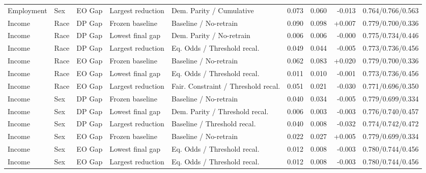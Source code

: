 \begin{table}[!t]
\begin{tabular}{lll l p{} rrr l}
Employment & Sex & EO Gap & Largest reduction & Dem. Parity / Cumulative & 0.073 & 0.060 & -0.013 & 0.764/0.766/0.563 \\
Income & Race & DP Gap & Frozen baseline & Baseline / No-retrain & 0.090 & 0.098 & +0.007 & 0.779/0.700/0.336 \\
Income & Race & DP Gap & Lowest final gap & Dem. Parity / No-retrain & 0.006 & 0.006 & -0.000 & 0.775/0.734/0.446 \\
Income & Race & DP Gap & Largest reduction & Eq. Odds / Threshold recal. & 0.049 & 0.044 & -0.005 & 0.773/0.736/0.456 \\
Income & Race & EO Gap & Frozen baseline & Baseline / No-retrain & 0.062 & 0.083 & +0.020 & 0.779/0.700/0.336 \\
Income & Race & EO Gap & Lowest final gap & Eq. Odds / Threshold recal. & 0.011 & 0.010 & -0.001 & 0.773/0.736/0.456 \\
Income & Race & EO Gap & Largest reduction & Fair. Constraint / Threshold recal. & 0.051 & 0.021 & -0.030 & 0.771/0.696/0.350 \\
Income & Sex & DP Gap & Frozen baseline & Baseline / No-retrain & 0.040 & 0.034 & -0.005 & 0.779/0.699/0.334 \\
Income & Sex & DP Gap & Lowest final gap & Dem. Parity / Threshold recal. & 0.006 & 0.003 & -0.003 & 0.776/0.740/0.457 \\
Income & Sex & DP Gap & Largest reduction & Baseline / Threshold recal. & 0.040 & 0.008 & -0.032 & 0.774/0.742/0.472 \\
Income & Sex & EO Gap & Frozen baseline & Baseline / No-retrain & 0.022 & 0.027 & +0.005 & 0.779/0.699/0.334 \\
Income & Sex & EO Gap & Lowest final gap & Eq. Odds / Threshold recal. & 0.012 & 0.008 & -0.003 & 0.780/0.744/0.456 \\
Income & Sex & EO Gap & Largest reduction & Eq. Odds / Threshold recal. & 0.012 & 0.008 & -0.003 & 0.780/0.744/0.456 \\
\bottomrule
\end{tabular}
\end{table}
